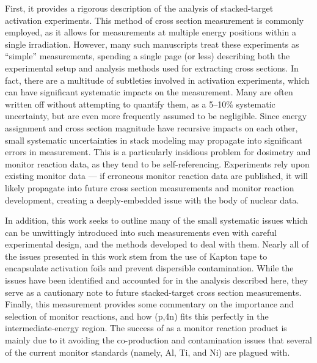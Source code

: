 First, it provides a rigorous  description of the analysis of stacked-target activation experiments.
This method of cross section measurement is commonly employed, as it allows for measurements at multiple energy positions within a single irradiation.
However, many such manuscripts treat these experiments as \enquote{simple} measurements, spending a single page (or less) describing  both the experimental setup and analysis methods used for extracting cross sections.
In fact, there are a multitude of subtleties involved in activation experiments, which can have significant systematic impacts on the measurement.
Many  are often written off without attempting to quantify them, as a 5--10\% systematic uncertainty, but are even more frequently assumed to be negligible. 
Since energy assignment and cross section magnitude have recursive impacts on each other, small systematic uncertainties in stack modeling may 
propagate into significant errors in measurement.
This is a particularly insidious problem for dosimetry and monitor reaction data, as they tend to be self-referencing.
Experiments rely upon existing monitor data --- if erroneous monitor reaction data are published, it will likely propagate into future cross section measurements and monitor reaction development, creating a deeply-embedded issue with the body of nuclear data.


In addition, this work seeks to outline many of the small systematic issues which can be unwittingly introduced into such measurements even with careful experimental design, and the methods developed to deal with them.
Nearly all of the issues presented in this work stem from the use of Kapton tape to encapsulate activation foils and prevent dispersible contamination.
While the issues have been identified and accounted for in the analysis described here, they serve as a cautionary note to future stacked-target cross section measurements.
Finally, this measurement provides some commentary on the importance and selection of monitor reactions, and how (p,4n) fits this perfectly in the intermediate-energy region.
The success of  as a monitor reaction product is mainly due to it avoiding the co-production and contamination issues that several of the current monitor standards (namely, Al, Ti, and Ni) are plagued with.



